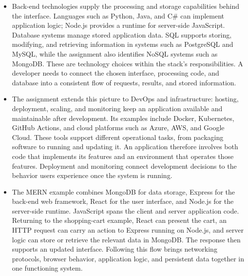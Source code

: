\documentclass[10pt]{article}
\begin{document}
\begin{itemize}[leftmargin=1.25em, itemsep=0.3em, parsep=0pt, topsep=0pt]
    \item Back-end technologies supply the processing and storage capabilities behind the interface. Languages such as Python, Java, and C\# can implement application logic; Node.js provides a runtime for server-side JavaScript. Database systems manage stored application data. SQL supports storing, modifying, and retrieving information in systems such as PostgreSQL and MySQL, while the assignment also identifies NoSQL systems such as MongoDB. These are technology choices within the stack's responsibilities. A developer needs to connect the chosen interface, processing code, and database into a consistent flow of requests, results, and stored information.

    \item The assignment extends this picture to DevOps and infrastructure: hosting, deployment, scaling, and monitoring keep an application available and maintainable after development. Its examples include Docker, Kubernetes, GitHub Actions, and cloud platforms such as Azure, AWS, and Google Cloud. These tools support different operational tasks, from packaging software to running and updating it. An application therefore involves both code that implements its features and an environment that operates those features. Deployment and monitoring connect development decisions to the behavior users experience once the system is running.

    \item The MERN example combines MongoDB for data storage, Express for the back-end web framework, React for the user interface, and Node.js for the server-side runtime. JavaScript spans the client and server application code. Returning to the shopping-cart example, React can present the cart, an HTTP request can carry an action to Express running on Node.js, and server logic can store or retrieve the relevant data in MongoDB. The response then supports an updated interface. Following this flow brings networking protocols, browser behavior, application logic, and persistent data together in one functioning system.
\end{itemize}

\end{document}
